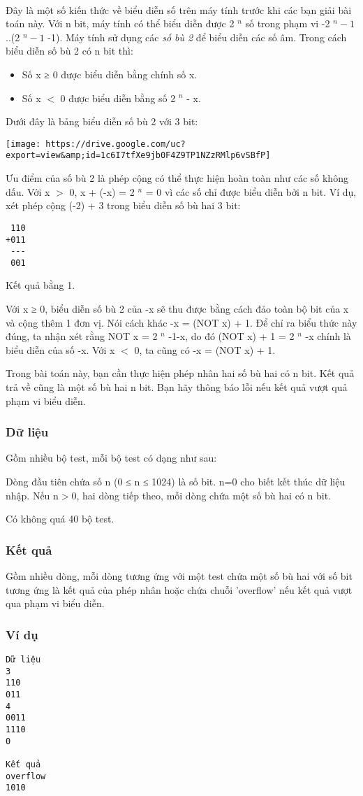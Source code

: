

 

Đây là một số kiến thức về biểu diễn số trên máy tính trước khi các bạn giải bài toán này. Với n bit, máy tính có thể biểu diễn được 2 $^ n $ số trong phạm vi -2 $^ n-1 $ ..(2 $^ n-1 $ -1). Máy tính sử dụng các \emph{ số bù 2 } để biểu diễn các số âm. Trong cách biểu diễn số bù 2 có n bit thì:
\begin{itemize}
	\item Số x ≥ 0 được biểu diễn bằng chính số x.
	\item Số x $<$ 0 được biểu diễn bằng số 2 $^ n $ - x.
\end{itemize}

Dưới đây là bảng biểu diễn số bù 2 với 3 bit:


\texttt{[image: https://drive.google.com/uc?export=view\&amp;id=1c6I7tfXe9jb0F4Z9TP1NZzRMlp6vSBfP]}

Ưu điểm của số bù 2 là phép cộng có thể thực hiện hoàn toàn như các số không dấu. Với x $>$ 0, x + (-x) = 2 $^ n $ = 0 vì các số chỉ được biểu diễn bởi n bit. Ví dụ, xét phép cộng (-2) + 3 trong biểu diễn số bù hai 3 bit:
\begin{verbatim}
 110
+011
 ---
 001
\end{verbatim}

Kết quả bằng 1.

Với x ≥ 0, biểu diễn số bù 2 của -x sẽ thu được bằng cách đảo toàn bộ bit của x và cộng thêm 1 đơn vị. Nói cách khác -x = (NOT x) + 1. Để chỉ ra biểu thức này đúng, ta nhận xét rằng NOT x = 2 $^ n $ -1-x, do đó (NOT x) + 1 = 2 $^ n $ -x chính là biểu diễn của số -x. Với x $<$ 0, ta cũng có -x = (NOT x) + 1.

Trong bài toán này, bạn cần thực hiện phép nhân hai số bù hai có n bit. Kết quả trả về cũng là một số bù hai n bit. Bạn hãy thông báo lỗi nếu kết quả vượt quả phạm vi biểu diễn.

\subsubsection{Dữ liệu}

Gồm nhiều bộ test, mỗi bộ test có dạng như sau:

Dòng đầu tiên chứa số n (0 ≤ n ≤ 1024) là số bit. n=0 cho biết kết thúc dữ liệu nhập. Nếu n$>$0, hai dòng tiếp theo, mỗi dòng chứa một số bù hai có n bit.

Có không quá 40 bộ test.

\subsubsection{Kết quả}

Gồm nhiều dòng, mỗi dòng tương ứng với một test chứa một số bù hai với số bit tương ứng là kết quả của phép nhân hoặc chứa chuỗi 'overflow' nếu kết quả vượt qua phạm vi biểu diễn.

\subsubsection{Ví dụ}
\begin{verbatim}
Dữ liệu
3
110
011
4
0011
1110
0

Kết quả
overflow
1010
\end{verbatim}